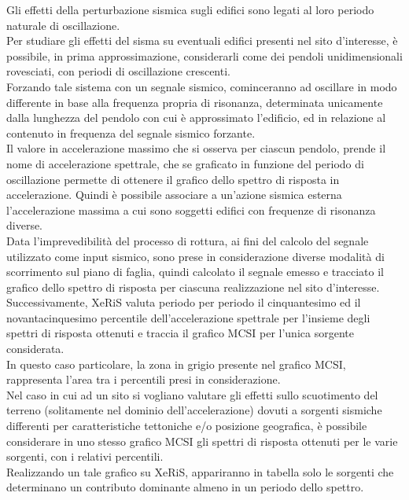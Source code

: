 \documentclass[a4paper,12pt,titlepage]{article}
\begin{document}
Gli effetti della perturbazione sismica sugli edifici sono legati al loro periodo naturale di oscillazione.\\
Per studiare gli effetti del sisma su eventuali edifici presenti nel sito d'interesse, è possibile, in prima approssimazione, considerarli come dei pendoli unidimensionali rovesciati, con periodi di oscillazione crescenti.\\
Forzando tale sistema con un segnale sismico, cominceranno ad oscillare in modo differente in base alla frequenza propria di risonanza, determinata unicamente dalla lunghezza del pendolo con cui è approssimato l'edificio, ed in relazione al contenuto in frequenza del segnale sismico forzante.\\
Il valore in accelerazione massimo che si osserva per ciascun pendolo, prende il nome di accelerazione spettrale, che se graficato in funzione del periodo di oscillazione permette di ottenere il grafico dello spettro di risposta in accelerazione. Quindi è possibile associare a un'azione sismica esterna l'accelerazione massima a cui sono soggetti edifici con frequenze di risonanza diverse.\\
Data l'imprevedibilità del processo di rottura, ai fini del calcolo del segnale utilizzato come input sismico, sono prese in considerazione diverse modalità di scorrimento sul piano di faglia, quindi calcolato il segnale emesso e tracciato il grafico dello spettro di risposta per ciascuna realizzazione nel sito d'interesse.\\
Successivamente, XeRiS valuta periodo per periodo il cinquantesimo ed il novantacinquesimo percentile dell'accelerazione spettrale per l'insieme degli spettri di risposta ottenuti e traccia il grafico MCSI per l'unica sorgente considerata.\\
In questo caso particolare, la zona in grigio presente nel grafico MCSI, rappresenta l'area tra i percentili presi in considerazione.\\
Nel caso in cui ad un sito si vogliano valutare gli effetti sullo scuotimento del terreno (solitamente nel dominio dell'accelerazione) dovuti a sorgenti sismiche differenti per caratteristiche tettoniche e/o posizione geografica, è possibile considerare in uno stesso grafico MCSI gli spettri di risposta ottenuti per le varie sorgenti, con i relativi percentili.\\
Realizzando un tale grafico su XeRiS, appariranno in tabella solo le sorgenti che determinano un contributo dominante almeno in un periodo dello spettro.\\
\end{document}
